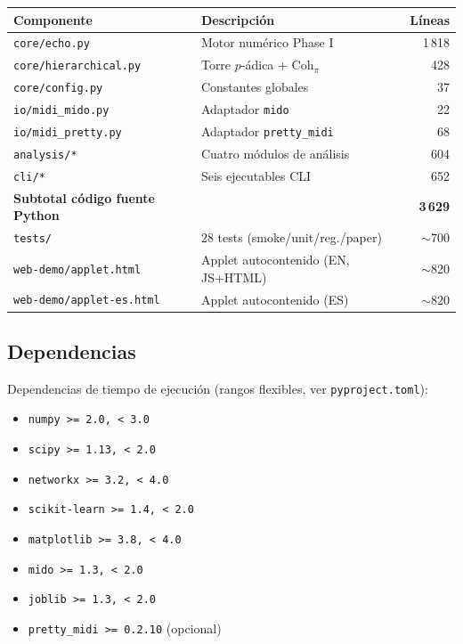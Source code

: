 \documentclass[11pt,a4paper,oneside]{article}
\theoremstyle{plain}
\theoremstyle{definition}
\theoremstyle{remark}
\newcommand{\Cohpi}{\mathrm{Coh}_\pi}
\newcommand{\code}[1]{\texttt{\small #1}}
\begin{document}
\begin{tabularx}{\linewidth}{lXr}
  \toprule
  \textbf{Componente} & \textbf{Descripción} & \textbf{Líneas} \\
  \midrule
  \code{core/echo.py}          & Motor numérico Phase I            & 1\,818 \\
  \code{core/hierarchical.py}  & Torre $p$-ádica + $\Cohpi$        &   428 \\
  \code{core/config.py}        & Constantes globales               &    37 \\
  \code{io/midi\_mido.py}      & Adaptador \code{mido}             &    22 \\
  \code{io/midi\_pretty.py}    & Adaptador \code{pretty\_midi}     &    68 \\
  \code{analysis/*}            & Cuatro módulos de análisis        &   604 \\
  \code{cli/*}                 & Seis ejecutables CLI              &   652 \\
  \midrule
  \textbf{Subtotal código fuente Python} & & \textbf{3\,629} \\
  \code{tests/}                & 28 tests (smoke/unit/reg./paper)  &   $\sim$700 \\
  \code{web-demo/applet.html}  & Applet autocontenido (EN, JS+HTML)&   $\sim$820 \\
  \code{web-demo/applet-es.html} & Applet autocontenido (ES)       &   $\sim$820 \\
  \bottomrule
\end{tabularx}

\subsection{Dependencias}

Dependencias de tiempo de ejecución (rangos flexibles, ver
\code{pyproject.toml}):

\begin{itemize}[noitemsep]
  \item \code{numpy >= 2.0, < 3.0}
  \item \code{scipy >= 1.13, < 2.0}
  \item \code{networkx >= 3.2, < 4.0}
  \item \code{scikit-learn >= 1.4, < 2.0}
  \item \code{matplotlib >= 3.8, < 4.0}
  \item \code{mido >= 1.3, < 2.0}
  \item \code{joblib >= 1.3, < 2.0}
  \item \code{pretty\_midi >= 0.2.10} (opcional)
\end{itemize}
\end{document}
